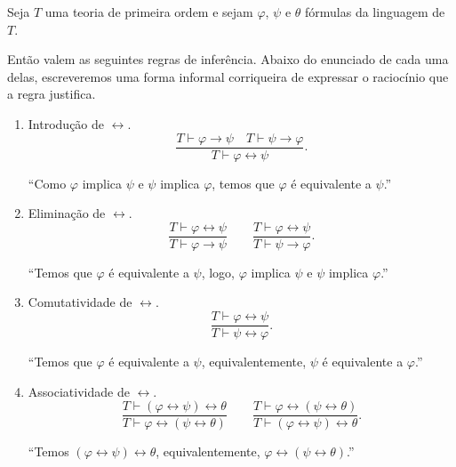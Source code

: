 \begin{metaproposition}\label{mprop:regrasProposicionaisBicondicional}
    Seja $T$ uma teoria de primeira ordem e sejam $\varphi$, $\psi$ e $\theta$ fórmulas da linguagem de $T$.

    Então valem as seguintes regras de inferência.
    Abaixo do enunciado de cada uma delas, escreveremos uma forma informal corriqueira de expressar o raciocínio que a regra justifica.

    \begin{enumerate}[label=(\roman*)]
        \item Introdução de $\leftrightarrow$.
        \[
            \frac{T\vdash \varphi\rightarrow\psi \quad T\vdash \psi\rightarrow\varphi}
                 {T\vdash \varphi\leftrightarrow\psi}.
        \]

        ``Como $\varphi$ implica $\psi$ e $\psi$ implica $\varphi$, temos que $\varphi$ é equivalente a $\psi$.''

        \item Eliminação de $\leftrightarrow$.
        \[
            \frac{T\vdash \varphi\leftrightarrow\psi}
                 {T\vdash \varphi\rightarrow\psi}
            \qquad
            \frac{T\vdash \varphi\leftrightarrow\psi}
                 {T\vdash \psi\rightarrow\varphi}.
        \]

        ``Temos que $\varphi$ é equivalente a $\psi$, logo, $\varphi$ implica $\psi$ e $\psi$ implica $\varphi$.''

        \item Comutatividade de $\leftrightarrow$.
        \[
            \frac{T\vdash \varphi\leftrightarrow\psi}
                 {T\vdash \psi\leftrightarrow\varphi}.
        \]

        ``Temos que $\varphi$ é equivalente a $\psi$, equivalentemente, $\psi$ é equivalente a $\varphi$.''

        \item Associatividade de $\leftrightarrow$.
        \[
            \frac{T\vdash (\varphi\leftrightarrow\psi)\leftrightarrow\theta}
                 {T\vdash \varphi\leftrightarrow(\psi\leftrightarrow\theta)}
            \qquad
            \frac{T\vdash \varphi\leftrightarrow(\psi\leftrightarrow\theta)}
                 {T\vdash (\varphi\leftrightarrow\psi)\leftrightarrow\theta}.
        \]

        ``Temos $(\varphi\leftrightarrow\psi)\leftrightarrow\theta$, equivalentemente, $\varphi\leftrightarrow(\psi\leftrightarrow\theta)$.''
        

\end{enumerate}
\end{metaproposition}
